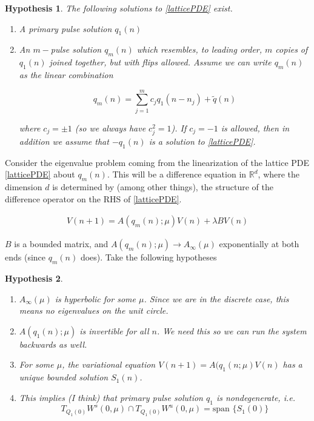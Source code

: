 \documentclass[12pt]{article}
\def\R{{\mathbb R}}
\newtheorem{hypothesis}{Hypothesis}
\begin{document}
\begin{hypothesis}\label{solexist}
The following solutions to \eqref{latticePDE} exist.
\begin{enumerate}
\item A primary pulse solution $q_1(n)$
\item An $m-$pulse solution $q_m(n)$ which resembles, to leading order, $m$ copies of $q_1(n)$ joined together, but with flips allowed. Assume we can write $q_m(n)$ as the linear combination

\begin{equation}\label{qm}
q_m(n) = \sum_{j = 1}^m c_j q_1(n - n_j) + \tilde{q}(n)
\end{equation}

where $c_j = \pm 1$ (so we always have $c_j^2 = 1$). If $c_j = -1$ is allowed, then in addition we assume that $-q_1(n)$ is a solution to \eqref{latticePDE}.
\end{enumerate}
\end{hypothesis}

Consider the eigenvalue problem coming from the linearization of the lattice PDE \eqref{latticePDE} about $q_m(n)$. This will be a difference equation in $\R^d$, where the dimension $d$ is determined by (among other things), the structure of the difference operator on the RHS of \eqref{latticePDE}.

\begin{align*}
V(n+1) = A(q_m(n); \mu) V(n) + \lambda B V(n)
\end{align*}

$B$ is a bounded matrix, and $A(q_m(n); \mu) \rightarrow A_\infty(\mu)$ exponentially at both ends (since $q_m(n)$ does). Take the following hypotheses

\begin{hypothesis}\label{initialhyp}
\[\]
\begin{enumerate}
	\item $A_\infty(\mu)$ is hyperbolic for some $\mu$. Since we are in the discrete case, this means no eigenvalues on the unit circle.
	\item $A(q_1(n); \mu)$ is invertible for all $n$. We need this so we can run the system backwards as well.
	\item For some $\mu$, the variational equation $V(n+1) = A(q_1(n; \mu) V(n)$ has a unique bounded solution $S_1(n)$.
	\item This implies (I think) that primary pulse solution $q_1$ is nondegenerate, i.e. 
	\[
	T_{Q_1(0)}W^s(0, \mu) \cap T_{Q_1(0)}W^u(0, \mu) = \text{span }\{ S_1(0) \}
	\]
\end{enumerate}
\end{hypothesis}
\end{document}
